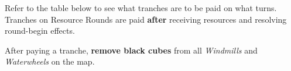 \begin{multicols*}{2}
    Refer to the table below to see what tranches are to be paid on what turns. Tranches on Resource Rounds are paid \textbf{after} receiving resources and resolving round-begin effects.

    After paying a tranche, \textbf{remove black cubes} from all \textit{Windmills} and \textit{Waterwheels} on the map.


\end{multicols*}
